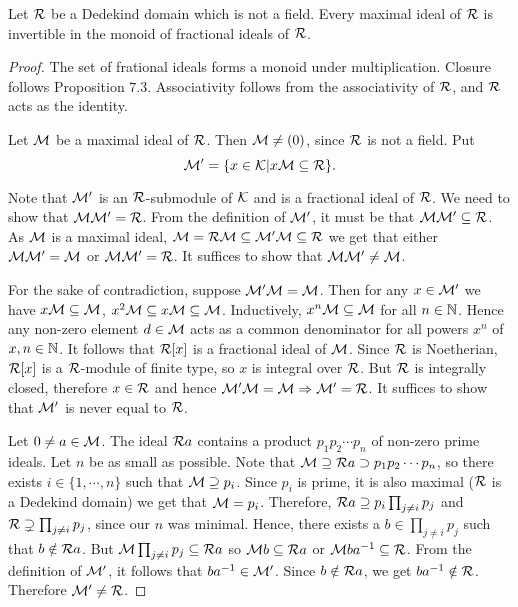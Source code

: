 \begin{theorem}
  Let $\mathcal{R}$ be a Dedekind domain which is not a field. Every maximal ideal of $\mathcal{R}$ is invertible in the monoid of fractional ideals of $\mathcal{R}$.
\end{theorem}
\begin{proof}
  The set of frational ideals forms a monoid under multiplication. Closure follows Proposition $7.3$. Associativity follows from the associativity of $\mathcal{R}$, and $\mathcal{R}$ acts as the identity.

  Let $\mathcal{M}$ be a maximal ideal of $\mathcal{R}$. Then $\mathcal{M} \neq (0)$, since $\mathcal{R}$ is not a field. Put
  \[\mathcal{M}' = \{x\in \mathcal{K} | x\mathcal{M} \subseteq \mathcal{R}\}.\]

  Note that $\mathcal{M}'$ is an $\mathcal{R}$-submodule of $\mathcal{K}$ and is a fractional ideal of $\mathcal{R}$. We need to show that $\mathcal{M}\mathcal{M}' = \mathcal{R}$. From the definition of $\mathcal{M}'$, it must be that $\mathcal{M}\mathcal{M}'\subseteq \mathcal{R}$. As $\mathcal{M}$ is a maximal ideal, $\mathcal{M} = \mathcal{R} \mathcal{M} \subseteq \mathcal{M}'\mathcal{M} \subseteq \mathcal{R}$
  we get that either $\mathcal{M} \mathcal{M}' = \mathcal{M}$ or $\mathcal{M}\mathcal{M}' = \mathcal{R}$. It suffices to show that $\mathcal{M}\mathcal{M}' \neq \mathcal{M}$.

  For the sake of contradiction, suppose $\mathcal{M}'\mathcal{M} = \mathcal{M}$. Then for any $x\in \mathcal{M}'$ we have $x\mathcal{M} \subseteq \mathcal{M}$, $x^2\mathcal{M} \subseteq x\mathcal{M} \subseteq \mathcal{M}$. Inductively, $x^n \mathcal{M} \subseteq \mathcal{M}$ for all $n\in \mathbb{N}$. Hence any non-zero element $d\in \mathcal{M}$ acts as a common denominator for all powers $x^n$ of $x, n\in \mathbb{N}$. It follows that $\mathcal{R}[x]$
  is a fractional ideal of $\mathcal{M}$. Since $\mathcal{R}$ is Noetherian, $\mathcal{R}[x]$ is a $\mathcal{R}$-module of finite type, so $x$ is integral over $\mathcal{R}$. But $\mathcal{R}$ is integrally closed, therefore $x\in\mathcal{R}$ and hence $\mathcal{M}'\mathcal{M} = \mathcal{M} \Rightarrow \mathcal{M}' = \mathcal{R}$. It suffices to show that $\mathcal{M}'$ is never equal to $\mathcal{R}$.

  Let $0\neq a \in \mathcal{M}$. The ideal $\mathcal{R} a$ contains a product $p_1 p_2\cdots p_n$ of non-zero prime ideals. Let $n$ be as small as possible. Note that $\mathcal{M} \supseteq \mathcal{R} a \supset p_1 p_2\cdots p_n$, so there exists $i\in \{1,\cdots, n\}$ such that $\mathcal{M} \supseteq p_i$. Since $p_i$ is prime, it is also maximal ($\mathcal{R}$ is a Dedekind domain) we get that $\mathcal{M} = p_i$.
  Therefore, $\mathcal{R} a \supseteq p_i \prod_{j\neq i}p_j$ and $\mathcal{R} \supsetneq \prod_{j\neq i}p_j$, since our $n$ was minimal. Hence, there exists a $b\in \prod_{j\neq i}p_j$ such that $b\notin \mathcal{R} a$. But
  $\mathcal{M} \prod_{j\neq i}p_j \subseteq \mathcal{R} a$ so $\mathcal{M} b \subseteq \mathcal{R} a$ or $ \mathcal{M} ba^{-1}\subseteq \mathcal{R}$. From the definition of $\mathcal{M}'$, it follows that $ba^{-1}\in \mathcal{M}'$. Since $b\notin \mathcal{R} a$, we get $ba^{-1}\notin \mathcal{R}$. Therefore $\mathcal{M}' \neq \mathcal{R}$.

\end{proof}


